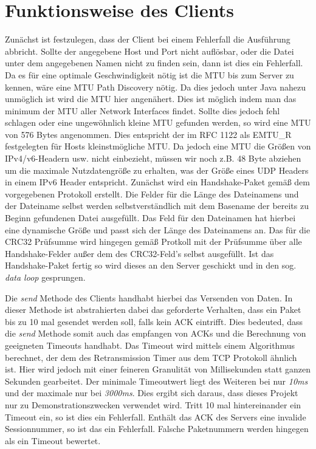 \chapter{Funktionsweise des Clients}

Zunächst ist festzulegen, dass der Client bei einem Fehlerfall die Ausführung abbricht.
Sollte der angegebene Host und Port nicht auflösbar, oder die Datei unter dem angegebenen Namen nicht zu finden sein, dann ist dies ein Fehlerfall.
Da es für eine optimale Geschwindigkeit nötig ist die MTU bis zum Server zu kennen, wäre eine MTU Path Discovery nötig.
Da dies jedoch unter Java nahezu unmöglich ist wird die MTU hier angenähert.
Dies ist möglich indem man das minimum der MTU aller Network Interfaces findet.
Sollte dies jedoch fehl schlagen oder eine ungewöhnlich kleine MTU gefunden werden, so wird eine MTU von 576 Bytes angenommen.
Dies entspricht der im RFC 1122 als EMTU\_R festgelegten für Hosts kleinstmögliche MTU.
Da jedoch eine MTU die Größen von IPv4/v6-Headern usw. nicht einbezieht, müssen wir noch z.B. 48 Byte abziehen um die maximale Nutzdatengröße zu erhalten, was der Größe eines UDP Headers in einem IPv6 Header entspricht.
Zunächst wird ein Handshake-Paket gemäß dem vorgegebenen Protokoll erstellt.
Die Felder für die Länge des Dateinamens und der Dateiname selbst werden selbstverständlich mit dem Basename der bereits zu Beginn gefundenen Datei ausgefüllt.
Das Feld für den Dateinamen hat hierbei eine dynamische Größe und passt sich der Länge des Dateinamens an.
Das für die CRC32 Prüfsumme wird hingegen gemäß Protkoll mit der Prüfsumme über alle Handshake-Felder außer dem des CRC32-Feld's selbst ausgefüllt.
Ist das Handshake-Paket fertig so wird dieses an den Server geschickt und in den sog. \textit{data loop} gesprungen. \newline

Die \textit{send} Methode des Clients handhabt hierbei das Versenden von Daten.
In dieser Methode ist abstrahierten dabei das geforderte Verhalten, dass ein Paket bis zu 10 mal gesendet werden soll, falls kein ACK eintrifft.
Dies bedeuted, dass die \textit{send} Methode somit auch das empfangen von ACKs und die Berechnung von geeigneten Timeouts handhabt.
Das Timeout wird mittels einem Algorithmus berechnet, der dem des Retransmission Timer aus dem TCP Protokoll ähnlich ist.
Hier wird jedoch mit einer feineren Granulität von Millisekunden statt ganzen Sekunden gearbeitet.
Der minimale Timeoutwert liegt des Weiteren bei nur \textit{10ms} und der maximale nur bei \textit{3000ms}.
Dies ergibt sich daraus, dass dieses Projekt nur zu Demonstrationszwecken verwendet wird.
Tritt 10 mal hintereinander ein Timeout ein, so ist dies ein Fehlerfall.
Enthält das ACK des Servers eine invalide Sessionnummer, so ist das ein Fehlerfall.
Falsche Paketnummern werden hingegen als ein Timeout bewertet. \newline

